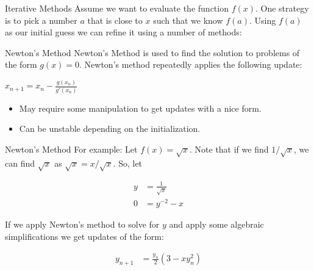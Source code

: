 \documentclass[serif,xcolor=pdftex,dvipsnames,table,hyperref={bookmarks=false,breaklinks}]{beamer}
\begin{document}
\begin{frame}[t]{Iterative Methods}
	Assume we want to evaluate the function $f(x)$. One strategy is to pick a number $a$ that is close to $x$ such that we know $f(a)$. Using $f(a)$ as our initial guess we can refine it using a number of methods:

	\begin{block}{Newton's Method}
		Newton's Method is used to find the solution to problems of the form $g(x) = 0$. Newton's method repeatedly applies the following update:

		\vspace{2mm}
		\centering
		\Large{$x_{n+1} = x_{n} - \frac{g(x_n)}{g'(x_n)}$}
	\end{block}

	\pause
	\normalsize
	\begin{itemize}[<+->]
		\item May require some manipulation to get updates with a nice form.
		\item Can be unstable depending on the initialization.
	\end{itemize}
\end{frame}

\begin{frame}[t]{Newton's Method}
	For example: Let $f(x) = \sqrt{x}$. Note that if we find $1/\sqrt{x}$, we can find $\sqrt{x}$ as $\sqrt{x} = x/\sqrt{x}$. So, let

	\begin{align*}
		y &= \frac{1}{\sqrt{x}}\\
		0 &= y^{-2} - x
	\end{align*}

	If we apply Newton's method to solve for $y$ and apply some algebraic simplifications we get updates of the form:


	\begin{align*}
		y_{n+1} &= \frac{y_n}{2}\left(3 - xy_n^2\right)
	\end{align*}

\end{frame}
\end{document}
